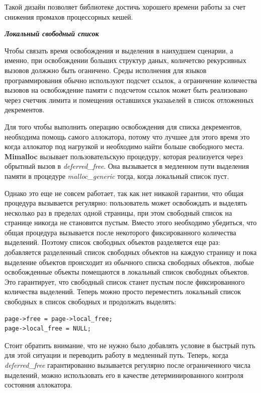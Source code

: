Такой дизайн позволяет библиотеке достичь хорошего времени работы за счет снижения промахов процессорных кешей.

\bigbreak
\textit{\textbf{Локальный свободный список}}

Чтобы связать время освобождения и выделения в наихудшем сценарии, а именно, при освобождении больших структур даных, количетсво рекурсивных вызовов должжно быть оганичено. Среды исполнения для языков программирования обычно используют подсчет ссылок, а ограничение количества вызовов на освобождение памяти с подсчетом ссылок может быть реализовано через счетчик лимита и помещения оставшихся указаьелей в список отложенных декрементов.

Для того чтобы выполнить операцию освобождения для списка декрементов, необходима помощь самого аллокатора, потому что лучшее для этого время это когда аллокатор под нагрузкой и необходимо найти больше свободного места. \textbf{Mimalloc} вызывает пользовательскую процедуру, которая реализуется через обрытный вызов в \textit{deferred\_free}. Она вызывается в медленном пути выделения памяти в процедуре \textit{malloc\_generic} тогда, когда локальный список пуст.

Однако это еще не совсем работает, так как нет никакой гарантии, что общая процедура вызывается регулярно: пользователь может освобождать и выделять несколько раз в пределах одной страницы, при этом свободный список на странице никогда не становится пустым. Вместо этого необходимо убедиться, что общая процедура вызывается после некоторого фиксированного количества выделений. Поэтому список свободных объектов разделяется еще раз: добавляется разделенный список свободных объектов на каждую страницу и пока выделение объектов происходит из обычного списка свободных объектов, любые освобожденные объекты помещаются в локальный список свободных объектов. Это гарантирует, что свободный список станет пустым после фиксированного количества выделений. Теперь можно просто переместить локальный список свободных в список свободных и продолжать выделять:

\begin{lstlisting}
page->free = page->local_free;
page->local_free = NULL;
\end{lstlisting}

Стоит обратить внимание, что не нужно было добавлять условие в быстрый путь для этой ситуации и переводить работу в медленный путь. Теперь, когда \textit{deferred\_free} гарантированно вызывается регулярно после ограниченного числа выделений, можно использовать его в качестве детерминированного контроля состояния аллокатора.

